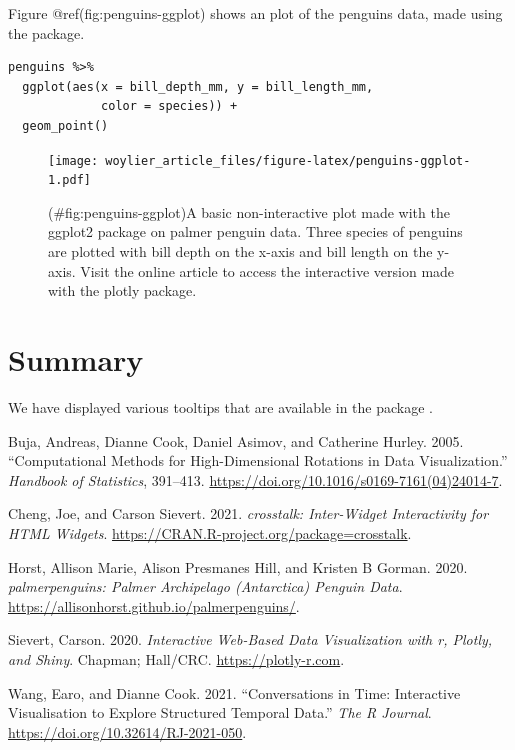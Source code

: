Figure @ref(fig:penguins-ggplot) shows an plot of the penguins data, made using the  package.

\begin{verbatim}
penguins %>% 
  ggplot(aes(x = bill_depth_mm, y = bill_length_mm, 
             color = species)) + 
  geom_point()
\end{verbatim}

\begin{figure}
\centering
\texttt{[image: woylier\_article\_files/figure-latex/penguins-ggplot-1.pdf]}
\caption{(\#fig:penguins-ggplot)A basic non-interactive plot made with the ggplot2 package on palmer penguin data. Three species of penguins are plotted with bill depth on the x-axis and bill length on the y-axis. Visit the online article to access the interactive version made with the plotly package.}
\end{figure}

\hypertarget{summary}{%
\section{Summary}\label{summary}}

We have displayed various tooltips that are available in the package .

\hypertarget{refs}{}
\begin{CSLReferences}{1}{0}
\leavevmode{}%
Buja, Andreas, Dianne Cook, Daniel Asimov, and Catherine Hurley. 2005. {``Computational Methods for High-Dimensional Rotations in Data Visualization.''} \emph{Handbook of Statistics}, 391--413. \url{https://doi.org/10.1016/s0169-7161(04)24014-7}.

\leavevmode{}%
Cheng, Joe, and Carson Sievert. 2021. \emph{{crosstalk}: Inter-Widget Interactivity for HTML Widgets}. \url{https://CRAN.R-project.org/package=crosstalk}.

\leavevmode{}%
Horst, Allison Marie, Alison Presmanes Hill, and Kristen B Gorman. 2020. \emph{{palmerpenguins}: Palmer Archipelago (Antarctica) Penguin Data}. \url{https://allisonhorst.github.io/palmerpenguins/}.

\leavevmode{}%
Sievert, Carson. 2020. \emph{{Interactive Web-Based Data Visualizatio}n with r, Plotly, and Shiny}. Chapman; Hall/CRC. \url{https://plotly-r.com}.

\leavevmode{}%
Wang, Earo, and Dianne Cook. 2021. {``Conversations in Time: Interactive Visualisation to Explore Structured Temporal Data.''} \emph{The R Journal}. \url{https://doi.org/10.32614/RJ-2021-050}.

\end{CSLReferences}

